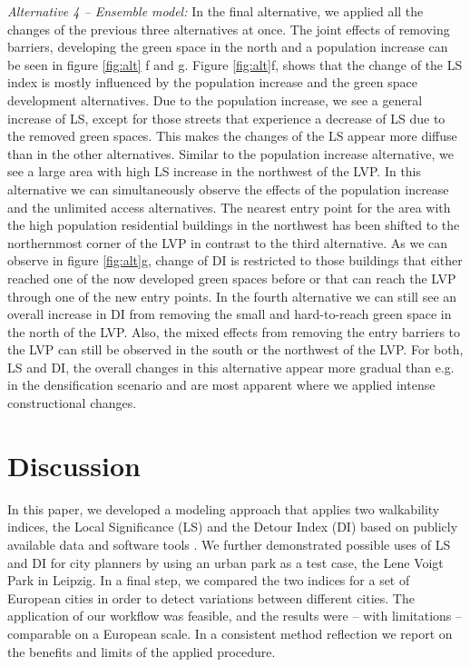 \documentclass[10pt]{article}
\begin{document}
\textit{Alternative 4 – Ensemble model:} In the final alternative, we applied all the changes of the previous three alternatives at once. 
The joint effects of removing barriers, developing the green space in the north and a population increase can be seen in figure \ref{fig:alt} f and g.
Figure \ref{fig:alt}f, shows that the change of the LS index is mostly influenced by the population increase and the green space development alternatives.
Due to the population increase, we see a general increase of LS, except for those streets that experience a decrease of LS due to the removed green spaces.
This makes the changes of the LS appear more diffuse than in the other alternatives.
Similar to the population increase alternative, we see a large area with high LS increase in the northwest of the LVP.
In this alternative we can simultaneously observe the effects of the population increase and the unlimited access alternatives.
The nearest entry point for the area with the high population residential buildings in the northwest has been shifted to the northernmost corner of the LVP in contrast to the third alternative.
As we can observe in figure \ref{fig:alt}g, change of DI is restricted to those buildings that either reached one of the now developed green spaces before or that can reach the LVP through one of the new entry points.
In the fourth alternative we can still see an overall increase in DI from removing the small and hard-to-reach green space in the north of the LVP.
Also, the mixed effects from removing the entry barriers to the LVP can still be observed in the south or the northwest of the LVP. 
For both, LS and DI, the overall changes in this alternative appear more gradual than e.g. in the densification scenario and are most apparent where we applied intense constructional changes.  



\section{Discussion}
In this paper, we developed a modeling approach that applies two walkability indices, the Local Significance (LS) and the Detour Index (DI) based on publicly available data and software tools \citep{EuropeanUnion.2020, RcoreTeam.2022, OpenStreetMapContributors.2020}.
We further demonstrated possible uses of LS and DI for city planners by using an urban park as a test case, the Lene Voigt Park in Leipzig.
In a final step, we compared the two indices for a set of European cities in order to detect variations between different cities. 
The application of our workflow was feasible, and the results were – with limitations – comparable on a European scale. 
In a consistent method reflection we report on the benefits and limits of the applied procedure.
\end{document}
